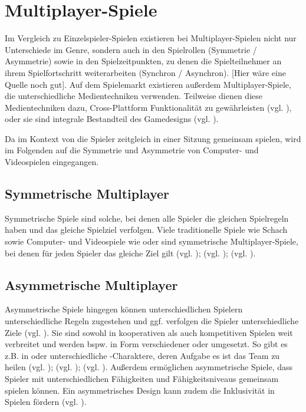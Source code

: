 \section{Multiplayer-Spiele}
Im Vergleich zu Einzelspieler-Spielen existieren bei Multiplayer-Spielen nicht nur Unterschiede im Genre, sondern auch in den Spielrollen (Symmetrie / Asymmetrie) sowie in den Spielzeitpunkten, zu denen die Spielteilnehmer an ihrem Spielfortschritt weiterarbeiten (Synchron / Asynchron). [Hier wäre eine Quelle noch gut]. Auf dem Spielemarkt existieren außerdem Multiplayer-Spiele, die unterschiedliche Medientechniken verwenden. Teilweise dienen diese Medientechniken dazu, Cross-Plattform Funktionalität zu gewährleisten (vgl. \cite{noauthor_baldurs_nodate}), oder sie sind integrale Bestandteil des Gamedesigns (vgl. \cite{noauthor_keep_nodate}).

Da im Kontext von  die Spieler zeitgleich in einer Sitzung gemeinsam spielen, wird im Folgenden auf die Symmetrie und Asymmetrie von Computer- und Videospielen eingegangen.

\subsection{Symmetrische Multiplayer}
Symmetrische Spiele sind solche, bei denen alle Spieler die gleichen Spielregeln haben und das gleiche Spielziel verfolgen. Viele traditionelle Spiele wie Schach sowie Computer- und Videospiele wie  oder  sind symmetrische Multiplayer-Spiele, bei denen für jeden Spieler das gleiche Ziel gilt (vgl. \cite[S. 12]{adams_fundamentals_2013}); (vgl. \cite{nintendo_mario_1992}); (vgl. \cite{noauthor_willkommen_2009}). 


\subsection{Asymmetrische Multiplayer}
Asymmetrische Spiele hingegen können unterschiedlichen Spielern unterschiedliche Regeln zugestehen und ggf. verfolgen die Spieler unterschiedliche Ziele (vgl. \cite[S. 12]{adams_fundamentals_2013}). Sie sind sowohl in kooperativen als auch kompetitiven Spielen weit verbreitet und werden bspw. in Form verschiedener  oder  umgesetzt. So gibt es z.B. in  oder   unterschiedliche -Charaktere, deren Aufgabe es ist das Team zu heilen (vgl. \cite{smilovitch_birdquestvr_2019}); (vgl. \cite{noauthor_league_2025}); (vgl. \cite{noauthor_overwatch_nodate}). 
Außerdem ermöglichen asymmetrische Spiele, dass Spieler mit unterschiedlichen Fähigkeiten und Fähigkeitsniveaus gemeinsam spielen können. Ein asymmetrisches Design kann zudem die Inklusivität in Spielen fördern (vgl. \cite{smilovitch_birdquestvr_2019}).

